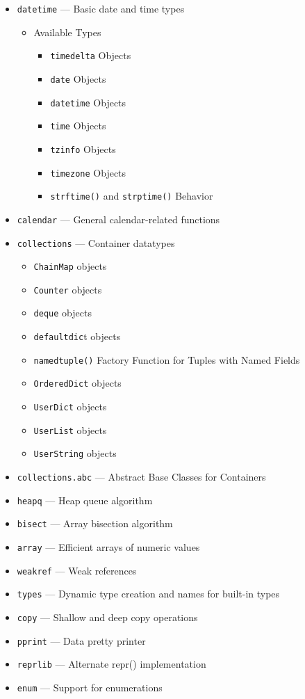 \documentclass[]{book}
\providecommand{\tightlist}{%
  \setlength{\itemsep}{0pt}\setlength{\parskip}{0pt}}
\theoremstyle{definition}
\theoremstyle{definition}
\theoremstyle{definition}
\theoremstyle{remark}
\begin{document}
\begin{itemize}
\tightlist
\item
  \texttt{datetime} --- Basic date and time types

  \begin{itemize}
  \tightlist
  \item
    Available Types

    \begin{itemize}
    \tightlist
    \item
      \texttt{timedelta} Objects
    \item
      \texttt{date} Objects
    \item
      \texttt{datetime} Objects
    \item
      \texttt{time} Objects
    \item
      \texttt{tzinfo} Objects
    \item
      \texttt{timezone} Objects
    \item
      \texttt{strftime()} and \texttt{strptime()} Behavior
    \end{itemize}
  \end{itemize}
\item
  \texttt{calendar} --- General calendar-related functions
\item
  \texttt{collections} --- Container datatypes

  \begin{itemize}
  \tightlist
  \item
    \texttt{ChainMap} objects
  \item
    \texttt{Counter} objects
  \item
    \texttt{deque} objects
  \item
    \texttt{defaultdic}t objects
  \item
    \texttt{namedtuple()} Factory Function for Tuples with Named Fields
  \item
    \texttt{OrderedDict} objects
  \item
    \texttt{UserDict} objects
  \item
    \texttt{UserList} objects
  \item
    \texttt{UserString} objects
  \end{itemize}
\item
  \texttt{collections.abc} --- Abstract Base Classes for Containers
\item
  \texttt{heapq} --- Heap queue algorithm
\item
  \texttt{bisect} --- Array bisection algorithm
\item
  \texttt{array} --- Efficient arrays of numeric values
\item
  \texttt{weakref} --- Weak references
\item
  \texttt{types} --- Dynamic type creation and names for built-in types
\item
  \texttt{copy} --- Shallow and deep copy operations
\item
  \texttt{pprint} --- Data pretty printer
\item
  \texttt{reprlib} --- Alternate repr() implementation
\item
  \texttt{enum} --- Support for enumerations
\end{itemize}
\end{document}
